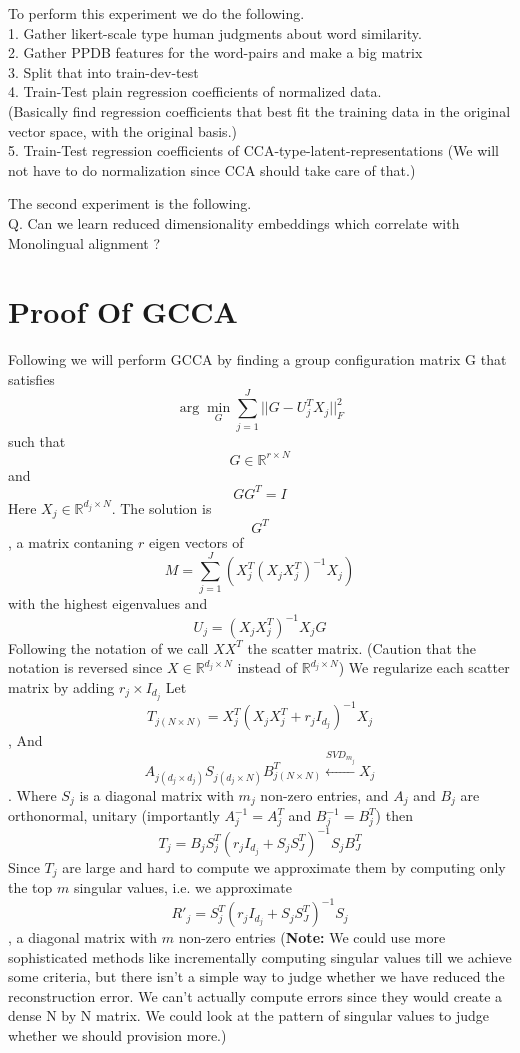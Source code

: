 \documentclass[11pt]{article}
\begin{document}
To perform this experiment we do the following.\\
1. Gather likert-scale type human judgments about word similarity.\\
2. Gather PPDB features for the word-pairs and make a big matrix \\
3. Split that into train-dev-test\\
4. Train-Test plain regression coefficients of normalized data. \\
   (Basically find regression coefficients that best fit the training
data in the original vector space, with the original basis.)\\
5. Train-Test regression coefficients of
CCA-type-latent-representations (We will not have to do normalization
since CCA should take care of that.) 

The second experiment is the following. \\
Q. Can we learn reduced dimensionality embeddings which correlate with
Monolingual alignment ?  \\

\section{Proof Of GCCA}
Following \cite{arora2014multiview} we will perform GCCA by finding a
group configuration matrix G that satisfies
$$ \arg\min_G \sum_{j=1}^{J} ||G-U_j^T X_j ||^2_F$$ such that
$$G \in \mathbb{R}^{r\times N} $$ and $$ GG^T = I $$
Here $X_j \in \mathbb{R}^{d_j \times N}$.
The solution is $$G^T$$, a matrix contaning $r$
eigen vectors of $$M = \sum_{j=1}^J (X_j^T(X_j X_j^T)^{-1}X_j)$$ with the
highest eigenvalues and $$U_j = (X_j X_j^T)^{-1}X_jG$$
Following the notation of \cite{hastie2009elements} we call $XX^T$ the
scatter matrix. (Caution that the notation is reversed since $X \in
\mathbb{R}^{d_j \times N}$ instead of $\mathbb{R}^{d_j \times N}$)
We regularize each scatter matrix by adding $r_j \times I_{d_j}$
Let $$T_{j (N \times N)} = X_j^T(X_j X_j^T + r_j I_{d_j})^{-1}X_j$$,
And $$ A_{j (d_j \times d_j)} S_{j(d_j \times N)} B^T_{j (N \times N)}\xleftarrow{SVD_{m_j}} X_j$$.
Where $S_j$ is a diagonal matrix with $m_j$ non-zero entries, 
and $A_j$ and $B_j$ are orthonormal, unitary (importantly $A_j^{-1} = A_j^{T}$ and $B_j^{-1} = B_j^{T}$)
then $$T_j = B_j S_j^T(r_j I_{d_j} + S_j S_J^T)^{-1}S_j B_J^T$$
Since $T_j$ are large and hard to compute we approximate them by
computing only the top $m$ singular values, i.e. we approximate
$$R'_j = S_j^T(r_j I_{d_j} + S_j S_J^T)^{-1}S_j$$
, a diagonal matrix with $m$ non-zero entries (\textbf{Note:} We could use
more sophisticated methods like incrementally computing singular
values till we achieve some criteria, but there isn't a simple way to
judge whether we have reduced the reconstruction error. We can't
actually compute errors since they would create a dense N by N
matrix. We could look at the pattern of singular values to judge
whether we should provision more.)
\end{document}
